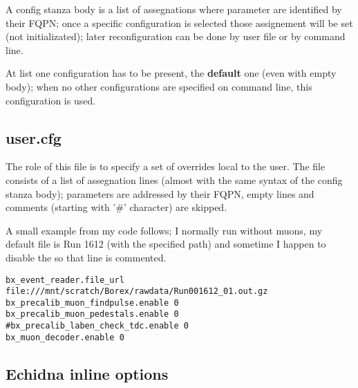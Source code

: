 \begin{itemize}
A config stanza body is a list of assegnations where parameter are identified by their FQPN; once a specific configuration
is selected those assignement will be set (not initializated); later reconfiguration can be done by user file or by 
command line.

At list one configuration has to be present, the {\bf default} one (even with empty body); when no other configurations
are specified on command line, this configuration is used.
\end{itemize}

\subsection{user.cfg}
\label{sec:conf_user_cfg}
The role of this file is to specify a set of overrides local to the user. The file consists of
a list of assegnation lines (almost with the same syntax of the config stanza body); parameters
are addressed by their FQPN, empty lines and comments (starting with '\#' character) are skipped.

A small example from my code follows; I normally run without muons, my default file is Run 1612 (with
the specified path) and sometime I happen to disable the  so that line
is commented.
\begin{verbatim}
bx_event_reader.file_url file:///mnt/scratch/Borex/rawdata/Run001612_01.out.gz
bx_precalib_muon_findpulse.enable 0
bx_precalib_muon_pedestals.enable 0
#bx_precalib_laben_check_tdc.enable 0
bx_muon_decoder.enable 0
\end{verbatim}


\subsection{Echidna inline options}
\label{conf_options}

